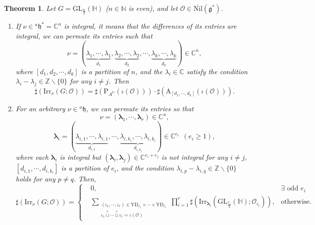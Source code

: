 \documentclass[12pt, a4paper]{amsart}
\numberwithin{equation}{section}
\newtheorem{thm}{Theorem}[section]
\newcommand{\blam}{{\boldsymbol{\lambda}}}
\newcommand{\BC}{{\mathbb {C}}}
\newcommand{\BH}{{\mathbb {H}}}
\newcommand{\BN}{{\mathbb {N}}}
\newcommand{\BZ}{{\mathbb {Z}}}
\newcommand{\CO}{{\mathcal {O}}}
\newcommand{\fg}{\mathfrak{g}}
\newcommand{\fh}{\mathfrak{h}}
\newcommand{\GL}{{\mathrm{GL}}}
\newcommand{\A}{{\mathrm{A}}}
\newcommand{\Irr}{{\mathrm{Irr}}}
\newcommand{\Nil}{{\mathrm{Nil}}}
\renewcommand{\bar}{\overline}
\begin{document}
\begin{thm}\label{H}
    Let $G= \GL_{\frac{n}{2}}(\BH)$ ($n \in \BN$ is even), and let $\CO \in \bar{\Nil}(\fg^*)$.
    \begin{enumerate}
        \item If $\nu \in {^a\fh^*} = \BC^n$ is integral, it means that the differences of its entries are integral, we can permute its entries such that 
        \[
        \nu =  (\underbrace{\lambda_1, \cdots, \lambda_1}_{d_1}, \underbrace{\lambda_2, \cdots, \lambda_2}_{d_2}, \cdots, \underbrace{\lambda_k, \cdots, \lambda_k}_{d_k} ) \in \BC^n,
        \]
        where $[d_1, d_2, \cdots, d_k]$ is a partition of $n$, and the $\lambda_i \in \BC$ satisfy the condition $\lambda_i - \lambda_j \in \BZ \backslash \{0\}$ for any $i \neq j$. Then
        \begin{equation}
            \sharp(\Irr_{\nu}(G;\CO)) = \sharp(\mathrm{P}_{A^{\BH}}(\iota(\CO)))\cdot \sharp(\A_{[d_1,\cdots,d_k]}(\iota(\CO))).
        \end{equation}
        \item For an arbitrary $\nu \in {^{a}\fh}$, we can permute its entries so that
        \[    
        \nu = (\blam_1, \cdots, \blam_r) \in \BC^n,
        \]
        \[
            \blam_i = (\underbrace{\lambda_{i,1}, \cdots, \lambda_{i,1}}_{d_{i,1}},\cdots,\underbrace{\lambda_{i,k_i},\cdots,\lambda_{i,k_i}}_{d_{i,k_i}}) \in \BC^{e_i} \ \ (e_i \geq 1),
         \] 
        where each $\blam_i$ is integral but $(\blam_i,\blam_j) \in \BC^{e_i+e_j}$ is not integral for any $i \neq j$, $[d_{i,1}, \cdots, d_{i,k_i}]$ is a partition of $e_i$, and the condition $\lambda_{i,p} - \lambda_{i,q} \in \BZ \backslash \{0\}$ holds for any $p \neq q$. Then,
        \begin{equation}
            \sharp(\Irr_{\nu}(G;\CO)) = \left\{
            \begin{aligned}
                &0 , & \textrm{$\exists$ odd $e_i$}\\
                &\sum_{\substack{(\iota_1,\cdots,\iota_r) \in \mathrm{YD}_{e_1} \times \cdots \times \mathrm{YD}_{e_r} \\ \iota_1 \mathop{\sqcup}\limits^r \cdots  \mathop{\sqcup}\limits^r \iota_r = \iota(\CO)}} \prod_{i=1}^r \sharp(\Irr_{\blam_i}(\GL_{\frac{e_i}{2}}(\BH);\CO_{\iota_i})), & \textrm{otherwise}.
            \end{aligned}
            \right.
        \end{equation}
    \end{enumerate}
\end{thm}
\end{document}
